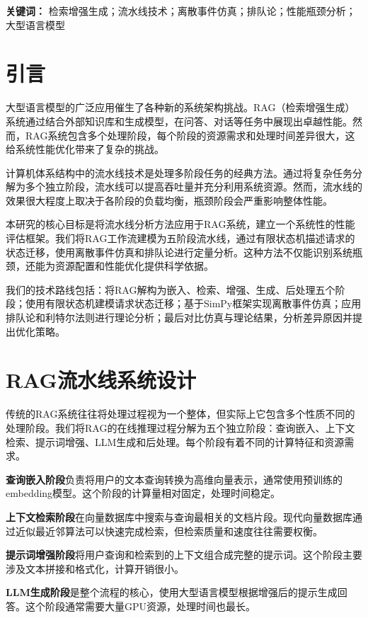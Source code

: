 \documentclass[a4paper]{article}
\begin{document}
\textbf{关键词：} 检索增强生成；流水线技术；离散事件仿真；排队论；性能瓶颈分析；大型语言模型

\newpage

\section{引言}

大型语言模型的广泛应用催生了各种新的系统架构挑战。RAG（检索增强生成）系统\cite{lewis2020retrieval}通过结合外部知识库和生成模型，在问答、对话等任务中展现出卓越性能。然而，RAG系统包含多个处理阶段，每个阶段的资源需求和处理时间差异很大，这给系统性能优化带来了复杂的挑战。

计算机体系结构中的流水线技术\cite{hennessy2019computer}是处理多阶段任务的经典方法。通过将复杂任务分解为多个独立阶段，流水线可以提高吞吐量并充分利用系统资源。然而，流水线的效果很大程度上取决于各阶段的负载均衡，瓶颈阶段会严重影响整体性能。

本研究的核心目标是将流水线分析方法应用于RAG系统，建立一个系统性的性能评估框架。我们将RAG工作流建模为五阶段流水线，通过有限状态机描述请求的状态迁移，使用离散事件仿真和排队论进行定量分析。这种方法不仅能识别系统瓶颈，还能为资源配置和性能优化提供科学依据。

我们的技术路线包括：将RAG解构为嵌入、检索、增强、生成、后处理五个阶段；使用有限状态机建模请求状态迁移；基于SimPy框架实现离散事件仿真；应用排队论和利特尔法则\cite{little1961proof}进行理论分析；最后对比仿真与理论结果，分析差异原因并提出优化策略。

\section{RAG流水线系统设计}

传统的RAG系统往往将处理过程视为一个整体，但实际上它包含多个性质不同的处理阶段。我们将RAG的在线推理过程分解为五个独立阶段：查询嵌入、上下文检索、提示词增强、LLM生成和后处理。每个阶段有着不同的计算特征和资源需求。

\textbf{查询嵌入阶段}负责将用户的文本查询转换为高维向量表示，通常使用预训练的embedding模型。这个阶段的计算量相对固定，处理时间稳定。

\textbf{上下文检索阶段}在向量数据库中搜索与查询最相关的文档片段。现代向量数据库通过近似最近邻算法可以快速完成检索，但检索质量和速度往往需要权衡\cite{joseph2022parallel}。

\textbf{提示词增强阶段}将用户查询和检索到的上下文组合成完整的提示词。这个阶段主要涉及文本拼接和格式化，计算开销很小。

\textbf{LLM生成阶段}是整个流程的核心，使用大型语言模型根据增强后的提示生成回答。这个阶段通常需要大量GPU资源，处理时间也最长。
\end{document}
